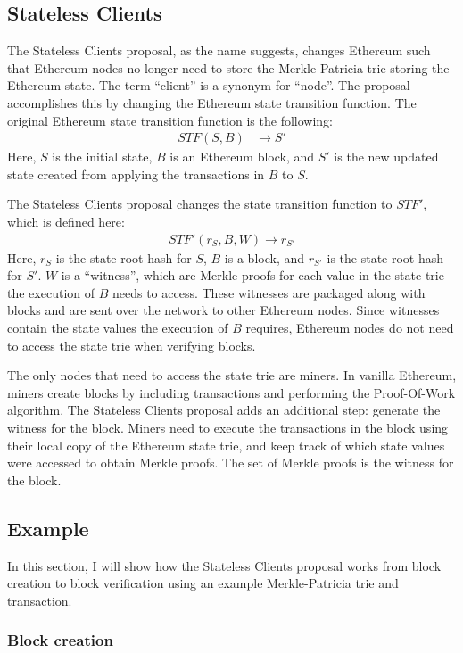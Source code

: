 \documentclass[12pt]{article}
\newcommand{\System}{Stateless Clients\xspace}
\begin{document}
\subsection{\System}

The \System proposal, as the name suggests, changes Ethereum such that Ethereum nodes no longer need to store the Merkle-Patricia trie storing the Ethereum state. The term ``client'' is a synonym for ``node''. The proposal accomplishes this by changing the Ethereum state transition function. The original Ethereum state transition function is the following:
\begin{align*}
  STF(S, B) &\to S'
\end{align*}
Here, $S$ is the initial state, $B$ is an Ethereum block, and $S'$ is the new updated state created from applying the transactions in $B$ to $S$.

The \System proposal changes the state transition function to $STF'$, which is defined here:
\begin{align*}
  STF'(r_S, B, W) \to r_{S'}
\end{align*}
Here, $r_S$ is the state root hash for $S$, $B$ is a block, and $r_{S'}$ is the state root hash for $S'$. $W$ is a ``witness'', which are Merkle proofs for each value in the state trie the execution of $B$ needs to access. These witnesses are packaged along with blocks and are sent over the network to other Ethereum nodes. Since witnesses contain the state values the execution of $B$ requires, Ethereum nodes do not need to access the state trie when verifying blocks.

The only nodes that need to access the state trie are miners. In vanilla Ethereum, miners create blocks by including transactions and performing the Proof-Of-Work algorithm. The \System proposal adds an additional step: generate the witness for the block. Miners need to execute the transactions in the block using their local copy of the Ethereum state trie, and keep track of which state values were accessed to obtain Merkle proofs. The set of Merkle proofs is the witness for the block.

\subsection{Example}

In this section, I will show how the \System proposal works from block creation to block verification using an example Merkle-Patricia trie and transaction.

\subsubsection{Block creation}
\end{document}
